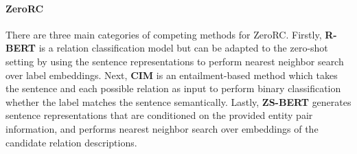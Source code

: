\documentclass[11pt]{article}
\begin{document}
\paragraph{ZeroRC}
There are three main categories of competing methods for ZeroRC.
Firstly, \textbf{R-BERT} \cite{wu2019enriching} is a relation classification model but can be adapted to the zero-shot setting by using the sentence representations to perform nearest neighbor search over label embeddings.
Next, \textbf{CIM} \cite{rocktaschel2015reasoning} is an entailment-based method which takes the sentence and each possible relation as input to perform binary classification whether the label matches the sentence semantically.
Lastly, \textbf{ZS-BERT} \cite{chen2021zs} generates sentence representations that are conditioned on the provided entity pair information, and performs nearest neighbor search over embeddings of the candidate relation descriptions.
\end{document}
